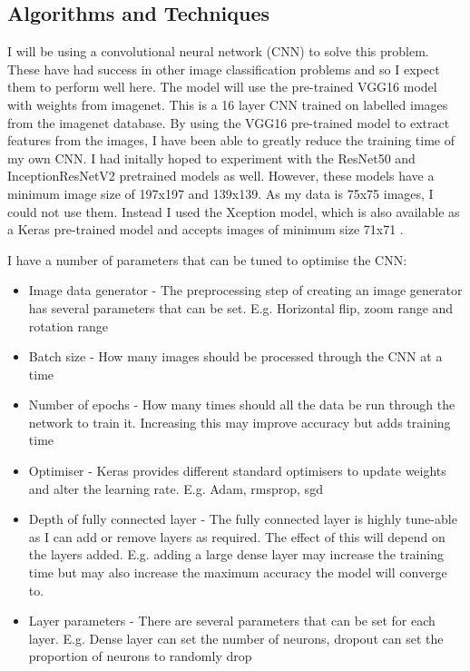 \documentclass{article}
\begin{document}
\subsection{Algorithms and Techniques}
I will be using a convolutional neural network (CNN) to solve this problem. These have had success in other image classification problems and so I expect them to perform well here. The model will use the pre-trained VGG16 model with weights from imagenet. This is a 16 layer CNN trained on labelled images from the imagenet database. By using the VGG16 pre-trained model to extract features from the images, I have been able to greatly reduce the training time of my own CNN. I had initally hoped to experiment with the ResNet50 and InceptionResNetV2 pretrained models as well. However, these models have a minimum image size of 197x197 and 139x139. As my data is 75x75 images, I could not use them. Instead I used the Xception model, which is also available as a Keras pre-trained model and accepts images of minimum size 71x71 \cite{keras-layers}. 

I have a number of parameters that can be tuned to optimise the CNN:
\begin{itemize}
\item Image data generator - The preprocessing step of creating an image generator has several parameters that can be set. E.g. Horizontal flip, zoom range and rotation range
\item Batch size - How many images should be processed through the CNN at a time
\item Number of epochs - How many times should all the data be run through the network to train it. Increasing this may improve accuracy but adds training time
\item Optimiser - Keras provides different standard optimisers to update weights and alter the learning rate. E.g. Adam, rmsprop, sgd
\item Depth of fully connected layer - The fully connected layer is highly tune-able as I can add or remove layers as required. The effect of this will depend on the layers added. E.g. adding a large dense layer may increase the training time but may also increase the maximum accuracy the model will converge to. 
\item Layer parameters - There are several parameters that can be set for each layer. E.g. Dense layer can set the number of neurons, dropout can set the proportion of neurons to randomly drop
\end{itemize}
\end{document}
